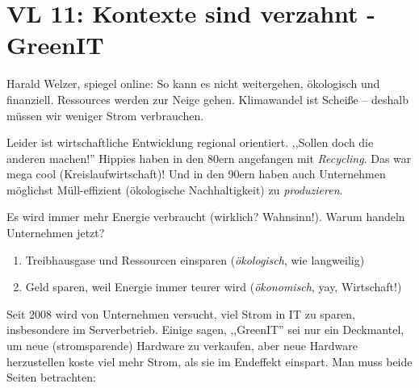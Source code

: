 \newpage
\section{VL 11: Kontexte sind verzahnt - GreenIT}

Harald Welzer, spiegel online: So kann es nicht weitergehen, ökologisch und
finanziell. Ressources werden zur Neige gehen.  Klimawandel ist Scheiße --
deshalb müssen wir weniger Strom verbrauchen.

Leider ist wirtschaftliche Entwicklung regional orientiert. ,,Sollen doch die anderen
machen!'' Hippies haben in den 80ern angefangen mit \emph{Recycling}. Das war mega
cool (Kreislaufwirtschaft)! Und in den 90ern haben auch Unternehmen möglichst
Müll-effizient (ökologische Nachhaltigkeit) zu \emph{produzieren}.

Es wird immer mehr Energie verbraucht (wirklich? Wahnsinn!). Warum handeln Unternehmen
jetzt?

\begin{enumerate}
\item Treibhausgase und Ressourcen einsparen (\emph{ökologisch}, wie langweilig)
\item Geld sparen, weil Energie immer teurer wird (\emph{ökonomisch}, yay, Wirtschaft!)
\end{enumerate}

Seit 2008 wird von Unternehmen versucht, viel Strom in IT zu sparen, insbesondere
im Serverbetrieb. Einige sagen, ,,GreenIT'' sei nur ein Deckmantel, um neue (stromsparende) Hardware
zu verkaufen, aber neue Hardware herzustellen koste viel mehr Strom, als sie im
Endeffekt einspart. Man muss beide Seiten betrachten:

